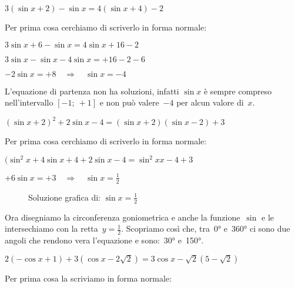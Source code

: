 \begin{exrig}
 \begin{esempio}
  $3(\sin x +2) - \sin x = 4 (\sin x +4)-2$
  
  Per prima cosa cerchiamo di scriverlo in forma normale:
  
  $3 \sin x +6 - \sin x = 4 \sin x +16-2$
  
  $3 \sin x - \sin x - 4 \sin x = +16-2-6 $
  
  $- 2 \sin x = +8 \quad \Rightarrow \quad \sin x = -4 $
  
  L'equazione di partenza non ha soluzioni, infatti $\sin x$ è sempre compreso 
  nell'intervallo $\left [-1;~+1 \right]$ e non può valere~$-4$ per alcun 
  valore di~$x$.
 \end{esempio}

 \begin{esempio}
  $(\sin x +2)^2 + 2 \sin x -4 = (\sin x +2)(\sin x -2)+3$
  
  Per prima cosa cerchiamo di scriverlo in forma normale:
  
  $(\sin^2 x +4 \sin x +4 + 2 \sin x -4 = \sin^2x x -4 +3$
  
  $+6 \sin x = +3 \quad \Rightarrow \quad \sin x = \frac{1}{2}$
  
\begin{figure}[!h] 
 \vspace{-6pt}
  \begin{center}
\begin{inaccessibleblock}[Soluzione grafica dell'equazione: 
    $\sin x = \frac{1}{2}$.]
    
    \caption{Soluzione grafica di: $\sin x = \frac{1}{2}$}
    \label{fig:trigo_equazione01}
\end{inaccessibleblock}
  \end{center}
\vspace{-18pt}
\end{figure} 

  Ora disegniamo la circonferenza goniometrica e anche la funzione~$\sin$ 
  e le intersechiamo con la retta~$y=\frac{1}{2}$.
  Scopriamo così che, tra~0° e~360° ci sono due angoli che rendono vera 
  l'equazione e sono:~30° e~150°. 
 \end{esempio}

 \begin{esempio}
  $2 ( -\cos x +1) + 3 (\cos x -2 \sqrt{2}) = 3 \cos x -\sqrt{2} (5 -\sqrt{2})$
  
  Per prima cosa la scriviamo in forma normale:
  

\end{esempio}
\end{exrig}
